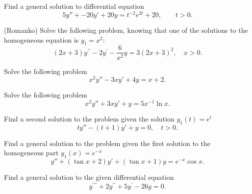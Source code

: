 \documentclass[11pt]{article}
\begin{document}
\begin{problem}
Find a general solution to differential equation
\begin{equation*}
5y'' + -20 y' +20 y = t^{-2}e^{2t}+20, \qquad t>0.
\end{equation*}
\end{problem}


\begin{problem}
(Romanko) Solve the following problem, knowing that one of the solutions to
the homogeneous equation is $y_1 = x^2$:
\begin{equation*}     
  \left( 2x + 3 \right) y^{\prime \prime} - 2 y^{\prime} - \frac {6} {x^2} y
  = 3 \left( 2x + 3 \right)^2, \quad x>0.
\end{equation*}
\end{problem}






\begin{problem}
Solve the following problem
\begin{equation*}
     x^{2}y''-3xy'+4y=x+2.
\end{equation*}
\end{problem}


\begin{problem}
Solve the following problem
\begin{equation*}     
     x^{2}y''+3xy'+y=5x^{-1}\ln x.
\end{equation*}
\end{problem}



\begin{problem}
Find a second solution to the problem given the solution $y_{1}(t)=e^{t}$
\begin{equation*}
ty''-(t+1)y'+y=0, \quad t>0.
\end{equation*}
\end{problem}


\begin{problem}
Find a general solution to the problem given the first solution to the homogeneous part $y_{1}(x)=e^{-x}$
\begin{equation*}
y''+(\tan x +2)y'+(\tan x+1)y=e^{-x}\cos x.
\end{equation*}
\end{problem}


\begin{problem}
Find a general solution to the given differential equation
\begin{equation*}
y^{\prime \prime \prime}+2y^{\prime \prime} + 5 y^{\prime} -26 y =0.
\end{equation*}
\end{problem}
\end{document}
